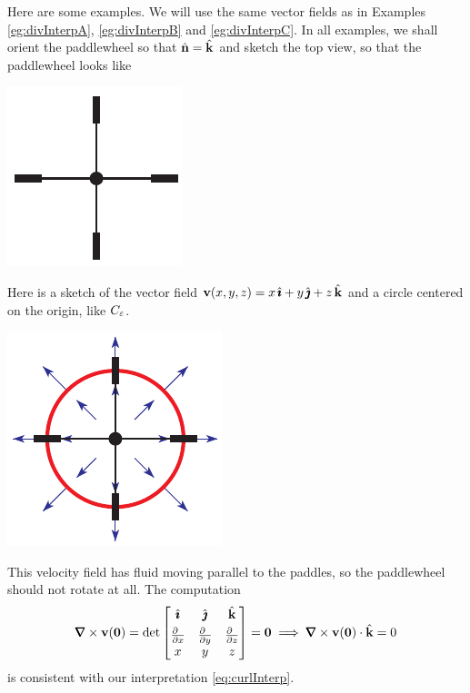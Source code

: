 Here are some examples. We will use the same vector fields as in Examples
\ref{eg:divInterpA}, \ref{eg:divInterpB} and \ref{eg:divInterpC}.
In all examples, we shall orient the paddlewheel so that $\hat{\mathbf{n}}=\hat{\mathbf{k}}$
and sketch the top view, so that the paddlewheel looks like
\begin{nfig}
\begin{center}
    \includegraphics{paddlewheelTop.pdf}
\end{center}
\end{nfig}



\begin{eg}\label{eg:curlInterpA}
Here is a sketch of the vector field $\mathbf{v}(x,y,z) = x\,\hat{\pmb{\imath}}+y\,\hat{\pmb{\jmath}}+z\,\hat{\mathbf{k}}$
and a circle centered on the origin, like $C_\varepsilon$. 
\begin{nfig}
\begin{center}
    \includegraphics{sourceCurl.pdf}
\end{center}
\end{nfig}
This velocity field has fluid moving parallel to the paddles,
so the paddlewheel should not rotate at all. The computation
\begin{align*}
\vnabla\times\vv(\vZero) =
\det\left[\begin{matrix}
          \hi & \hj &\hk \\[0.05in]
          \frac{\partial\hfill}{\partial x} &
              \frac{\partial\hfill}{\partial y} &
              \frac{\partial\hfill}{\partial z}  \\
           x & y & z
          \end{matrix}
     \right] 
=\vZero
\implies \vnabla\times\vv(\vZero)\cdot\hk = 0
\end{align*}
is consistent with our interpretation \eqref{eq:curlInterp}.
\end{eg}


